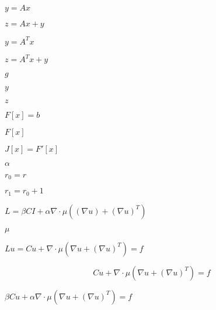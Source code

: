 \documentclass{article}
\begin{document}
$ y=Ax $
\pagebreak

$ z=Ax+y $
\pagebreak

$ y=A^{T} x $
\pagebreak

$ z=A^{T}x+y $
\pagebreak

$g$
\pagebreak

$y$
\pagebreak

$z$
\pagebreak

$ F[x]=b $
\pagebreak

$F[x]$
\pagebreak

$J[x] = F'[x]$
\pagebreak

$ \alpha $
\pagebreak

$ r_0 = r $
\pagebreak

$ r_1 = r_0 + 1 $
\pagebreak

$ L = \beta C I + \alpha \nabla \cdot \mu ( (\nabla u) + (\nabla u)^T ) $
\pagebreak

$ \mu $
\pagebreak

$ \mbox{$L u$} = C u + \nabla \cdot \mu (\nabla u + (\nabla u)^T) = f $
\pagebreak

\[ C u + \nabla \cdot \mu (\nabla u + (\nabla u)^T) = f \]
\pagebreak

$ \beta C u + \alpha \nabla \cdot \mu (\nabla u + (\nabla u)^T) = f $
\pagebreak
\end{document}
